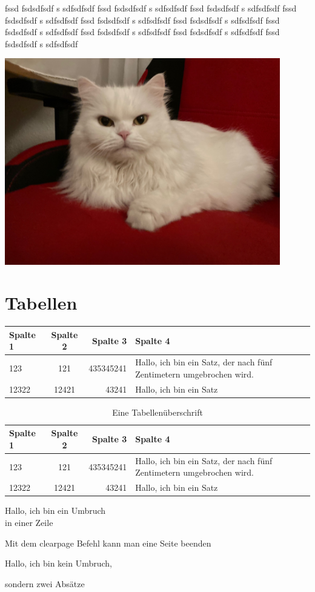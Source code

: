 \documentclass[12pt,ngerman,parskip=half]{scrreprt}
\begin{document}
\blindtext[2] fssd fsdsdfsdf s sdfsdfsdf fssd fsdsdfsdf s sdfsdfsdf fssd fsdsdfsdf s sdfsdfsdf fssd fsdsdfsdf s sdfsdfsdf fssd fsdsdfsdf s sdfsdfsdf fssd fsdsdfsdf s sdfsdfsdf fssd fsdsdfsdf s sdfsdfsdf fssd fsdsdfsdf s sdfsdfsdf fssd fsdsdfsdf s sdfsdfsdf fssd fsdsdfsdf s sdfsdfsdf 


\begin{minipage}{\textwidth}
\begin{center}
\includegraphics[width=0.9\textwidth]{./Bilder/Katze.jpg} %
\label{fig:katze2}
\end{center}
\end{minipage}


\chapter{Tabellen}\label{ch:tabelle}

\begin{tabular}{|l|c|r|p{5cm}|} \hline
\textbf{Spalte 1} & \textbf{Spalte 2} & \textbf{Spalte 3} & \textbf{Spalte 4} \\ \hline
123 & 121 & 435345241 & Hallo, ich bin ein Satz, der nach fünf Zentimetern umgebrochen wird. \\ \hline
12322 & 12421 & 43241 & Hallo, ich bin ein Satz \\ \hline
\end{tabular}


\begin{table}[h]
\begin{center}
\caption{Eine Tabellenüberschrift}
\begin{tabular}{lcrp{5cm}} \toprule
\textbf{Spalte 1} & \textbf{Spalte 2} & \textbf{Spalte 3} & \textbf{Spalte 4} \\ \midrule
123 & 121 & 435345241 & Hallo, ich bin ein Satz, der nach fünf Zentimetern umgebrochen wird. \\ 
12322 & 12421 & 43241 & Hallo, ich bin ein Satz \\ \bottomrule
\end{tabular}
\end{center}
\end{table}

Hallo, ich bin ein Umbruch \\ in einer Zeile

Mit dem clearpage Befehl kann man eine Seite beenden

\clearpage

Hallo, ich bin kein Umbruch, 

sondern zwei Absätze 
\end{document}
